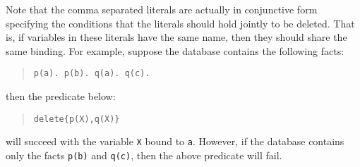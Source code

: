 \documentclass[11pt]{article}
\begin{document}
Note that the comma separated literals are actually in conjunctive
form specifying the conditions that the literals should hold jointly
to be deleted. That is, if variables in these literals have the same
name, then they should share the same binding. For example, suppose
the database contains the following facts:
\begin{quote}
\begin{verbatim}
p(a). p(b). q(a). q(c).
\end{verbatim}
\end{quote}
then the predicate below:
\begin{quote}
\begin{verbatim}
delete{p(X),q(X)}
\end{verbatim}
\end{quote}
will succeed with the variable {\tt X} bound to {\tt a}.  However, if
the database contains only the facts {\tt p(b)} and {\tt q(c)}, then
the above predicate will fail.
\end{document}
